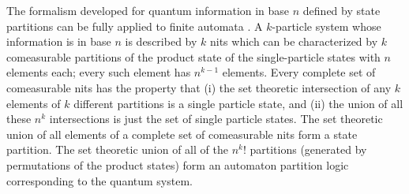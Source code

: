 The formalism developed for quantum information in base $n$ defined by state partitions
can be fully applied to finite automata \cite{svozil-2002-statepart-prl}.
A $k$-particle system whose information is in base $n$
is described by $k$ nits which can be characterized by $k$
comeasurable partitions of the product state of the single-particle
states with $n$ elements each; every such element has $n^{k-1}$ elements.
Every complete set of comeasurable nits has the property that
(i) the set theoretic intersection of any $k$ elements of $k$ different
partitions is a single particle state, and (ii) the union of all these $n^k$
intersections is just the set of single particle states.
The set theoretic union of all elements of a complete set of comeasurable nits
form a state partition.
The set theoretic union of all of the $n^k!$ partitions
(generated by permutations of the product states)
form an automaton partition logic
corresponding to the quantum system.

